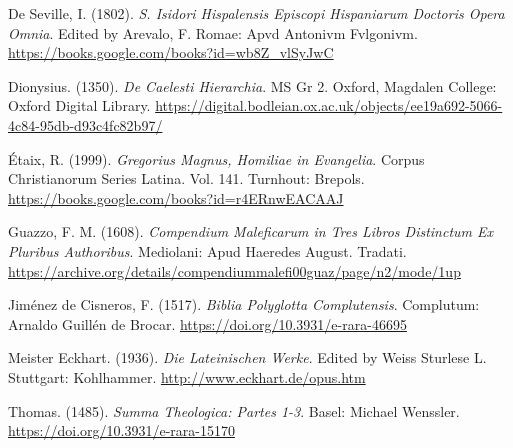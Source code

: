 \documentclass[
]{article}
\begin{document}
De Seville, I. (1802). \emph{S. Isidori Hispalensis Episcopi Hispaniarum
Doctoris Opera Omnia}. Edited by Arevalo, F. Romae: Apvd Antonivm
Fvlgonivm. \url{https://books.google.com/books?id=wb8Z_vlSyJwC}

Dionysius. (1350). \emph{De Caelesti Hierarchia}. MS Gr 2. Oxford,
Magdalen College: Oxford Digital Library.
\url{https://digital.bodleian.ox.ac.uk/objects/ee19a692-5066-4c84-95db-d93c4fc82b97/}

Étaix, R. (1999). \emph{Gregorius Magnus, Homiliae in Evangelia}. Corpus
Christianorum Series Latina. Vol. 141. Turnhout: Brepols.
\url{https://books.google.com/books?id=r4ERnwEACAAJ}

Guazzo, F. M. (1608). \emph{Compendium Maleficarum in Tres Libros
Distinctum Ex Pluribus Authoribus}. Mediolani: Apud Haeredes August.
Tradati.
\url{https://archive.org/details/compendiummalefi00guaz/page/n2/mode/1up}

Jiménez de Cisneros, F. (1517). \emph{Biblia Polyglotta Complutensis}.
Complutum: Arnaldo Guillén de Brocar.
\url{https://doi.org/10.3931/e-rara-46695}

Meister Eckhart. (1936). \emph{Die Lateinischen Werke}. Edited by Weiss
Sturlese L. Stuttgart: Kohlhammer. \url{http://www.eckhart.de/opus.htm}

Thomas. (1485). \emph{Summa Theologica: Partes 1-3}. Basel: Michael
Wenssler. \url{https://doi.org/10.3931/e-rara-15170}
\end{document}
